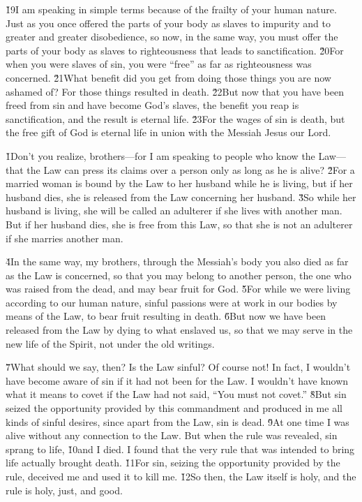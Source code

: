\v{19}I am speaking in simple terms because of the frailty of your human nature. Just as you once offered the parts of your body as slaves to impurity and to greater and greater disobedience, so now, in the same way, you must offer the parts of your body as slaves to righteousness that leads to sanctification. \v{20}For when you were slaves of sin, you were ``free'' as far as righteousness was concerned. \v{21}What benefit did you get from doing those things you are now ashamed of? For those things resulted in death. \v{22}But now that you have been freed from sin and have become God's slaves, the benefit you reap is sanctification, and the result is eternal life. \v{23}For the wages of sin is death, but the free gift of God is eternal life in union with the Messiah Jesus our Lord.

\v{1}Don't you realize, brothers---for I am speaking to people who know the Law---that the Law can press its claims over a person only as long as he is alive? \v{2}For a married woman is bound by the Law to her husband while he is living, but if her husband dies, she is released from the Law concerning her husband. \v{3}So while her husband is living, she will be called an adulterer if she lives with another man. But if her husband dies, she is free from this Law, so that she is not an adulterer if she marries another man.

\v{4}In the same way, my brothers, through the Messiah's body you also died as far as the Law is concerned, so that you may belong to another person, the one who was raised from the dead, and may bear fruit for God. \v{5}For while we were living according to our human nature, sinful passions were at work in our bodies by means of the Law, to bear fruit resulting in death. \v{6}But now we have been released from the Law by dying to what enslaved us, so that we may serve in the new life of the Spirit, not under the old writings.

\v{7}What should we say, then? Is the Law sinful? Of course not! In fact, I wouldn't have become aware of sin if it had not been for the Law. I wouldn't have known what it means to covet if the Law had not said, ``You must not covet.'' \v{8}But sin seized the opportunity provided by this commandment and produced in me all kinds of sinful desires, since apart from the Law, sin is dead. \v{9}At one time I was alive without any connection to the Law. But when the rule was revealed, sin sprang to life, \v{10}and I died. I found that the very rule that was intended to bring life actually brought death. \v{11}For sin, seizing the opportunity provided by the rule, deceived me and used it to kill me. \v{12}So then, the Law itself is holy, and the rule is holy, just, and good.

